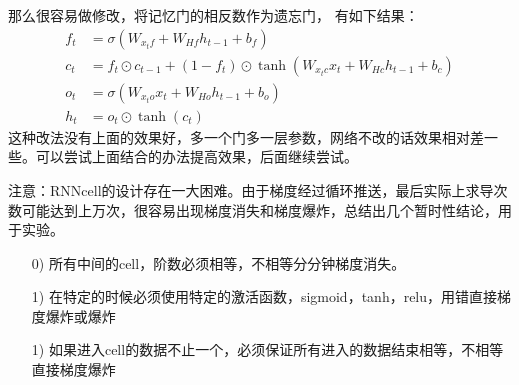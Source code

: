 \documentclass[11pt]{ctexart}
\begin{document}
那么很容易做修改，将记忆门的相反数作为遗忘门， 有如下结果：
\begin{equation}
\begin{split}
    f_t &= \sigma (W_{x_t f} +W_{H f} h_{t-1} + b_f)\\
    c_t &= f_t \odot c_{t-1} + (1-f_t) \odot \tanh (W_{x_t c} x_t +W_{H c} h_{t-1} + b_c)\\
    o_t &= \sigma (W_{x_t o} x_t +W_{H o} h_{t-1} + b_o)\\
    h_t &= o_t \odot \tanh(c_t)
\end{split}
\end{equation}
这种改法没有上面的效果好，多一个门多一层参数，网络不改的话效果相对差一些。可以尝试上面结合的办法提高效果，后面继续尝试。


注意：RNNcell的设计存在一大困难。由于梯度经过循环推送，最后实际上求导次数可能达到上万次，很容易出现梯度消失和梯度爆炸，总结出几个暂时性结论，用于实验。
\begin{itemize}
  \item [0)]
  所有中间的cell，阶数必须相等，不相等分分钟梯度消失。
  \item [1)]
  在特定的时候必须使用特定的激活函数，sigmoid，tanh，relu，用错直接梯度爆炸或爆炸
  \item [1)]
  如果进入cell的数据不止一个，必须保证所有进入的数据结束相等，不相等直接梯度爆炸
\end{itemize}
\end{document}
